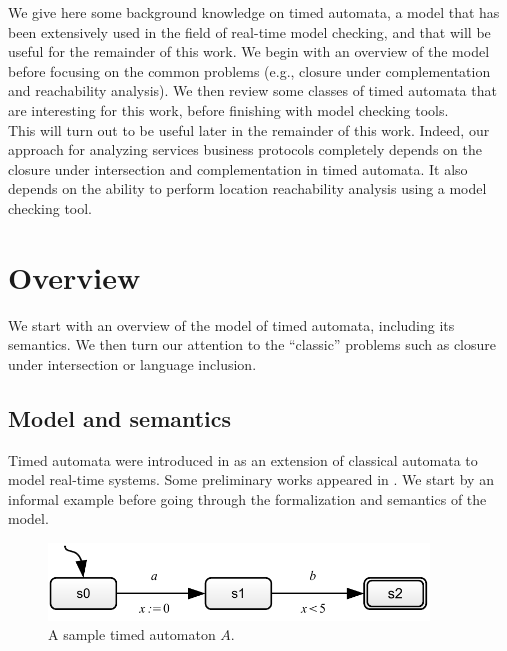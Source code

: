 
We give here some background knowledge on timed automata, a model that has been extensively used in the field of real-time model checking, and that will be useful for the remainder of this work. We begin with an overview of the model before focusing on the common problems (e.g., closure under complementation and reachability analysis). We then review some classes of timed automata that are interesting for this work, before finishing with model checking tools. \\

This will turn out to be useful later in the remainder of this work. Indeed, our approach for analyzing services business protocols completely depends on the closure under intersection and complementation in timed automata. It  also depends on the ability to perform location reachability analysis using a model checking tool.


\section{Overview}


We start with an overview of the model of timed automata, including its semantics. We then turn our attention to the ``classic'' problems such as closure under intersection or language inclusion.


\subsection{Model and semantics}


Timed automata were introduced in \cite{RADLD94} as an extension of classical automata \cite{Hopcroft79} to model real-time systems. Some preliminary works appeared in \cite{RACC94}. We start by an informal example before going through the formalization and semantics of the model.

\begin{figure}[htbp]
    \centering
    \includegraphics[width=0.9\textwidth]{content/timed-automata/sample-ta}
    \caption{A sample timed automaton $A$.}
    \label{fig:sample-ta}
\end{figure}

